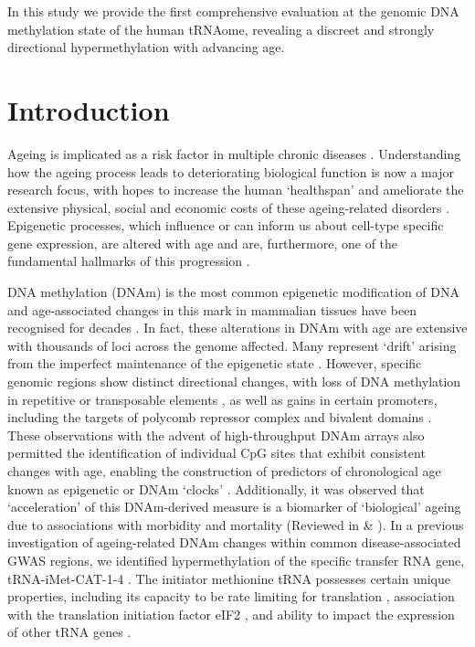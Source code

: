 \documentclass[]{book}
\begin{document}
In this study we provide the first comprehensive evaluation at the genomic DNA methylation state of the human tRNAome, revealing a discreet and strongly directional hypermethylation with advancing age.

\newpage

\hypertarget{introduction-1}{%
\section{Introduction}\label{introduction-1}}

Ageing is implicated as a risk factor in multiple chronic diseases \citep{Partridge2018}.
Understanding how the ageing process leads to deteriorating biological function is now a major research focus, with hopes to increase the human `healthspan' and ameliorate the extensive physical, social and economic costs of these ageing-related disorders \citep{Campisi2019}.
Epigenetic processes, which influence or can inform us about cell-type specific gene expression, are altered with age and are, furthermore, one of the fundamental hallmarks of this progression \citep{Lopez-Otin2013, Booth2016}.

DNA methylation (DNAm) is the most common epigenetic modification of DNA and age-associated changes in this mark in mammalian tissues have been recognised for decades \citep{Wilson1983}.
In fact, these alterations in DNAm with age are extensive with thousands of loci across the genome affected.
Many represent `drift' arising from the imperfect maintenance of the epigenetic state \citep{Fraga2005}.
However, specific genomic regions show distinct directional changes, with loss of DNA methylation in repetitive or transposable elements \citep{Chuong2017}, as well as gains in certain promoters, including the targets of polycomb repressor complex \citep{Teschendorff2010} and bivalent domains \citep{Rakyan2010}.
These observations with the advent of high-throughput DNAm arrays also permitted the identification of individual CpG sites that exhibit consistent changes with age, enabling the construction of predictors of chronological age known as epigenetic or DNAm `clocks' \citep{Hannum2013, Horvath2013, Weidner2014, Bell2019}.
Additionally, it was observed that `acceleration' of this DNAm-derived measure is a biomarker of `biological' ageing due to associations with morbidity and mortality (Reviewed in \citep{Horvath2018} \& \citep{Field2018}).
In a previous investigation of ageing-related DNAm changes within common disease-associated GWAS regions, we identified hypermethylation of the specific transfer RNA gene, tRNA-iMet-CAT-1-4 \citep{Bell2016}.
The initiator methionine tRNA possesses certain unique properties, including its capacity to be rate limiting for translation \citep{Rideout2012}, association with the translation initiation factor eIF2 \citep{Kolitz2010}, and ability to impact the expression of other tRNA genes \citep{Pavon-Eternod2013}.
\end{document}
